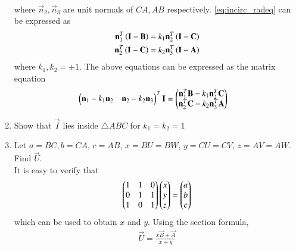 \begin{enumerate}[label=\arabic*.,ref=\thesubsection.\theenumi]
\begin{align}
\label{eq:incirc_radeq}
\end{align}
%
where $\vec{n}_2, \vec{n}_3$ are unit normals of $CA, AB$ respectively.  \eqref{eq:incirc_radeq} can be 
expressed as 
\begin{align}
\mathbf{n}_1^T\left(\mathbf{I}-\mathbf{B}\right) &= k_1\mathbf{n}_2^T\left(\mathbf{I}-\mathbf{C}\right) 
\\
\mathbf{n}_2^T\left(\mathbf{I}-\mathbf{C}\right) &= k_2\mathbf{n}_3^T\left(\mathbf{I}-\mathbf{A}\right)
\label{eq:incirc_k1k2}
\end{align}
%
where $k_1,k_2 = \pm 1$. The above equations can be expressed as the matrix equation
\begin{align}
\begin{pmatrix}\mathbf{n}_1-k_1\mathbf{n}_2 & \mathbf{n}_2 - k_2\mathbf{n}_3\end{pmatrix}^T\mathbf{I} &= 
\begin{pmatrix}\mathbf{n}_1^T\mathbf{B}-k_1\mathbf{n}_2^T\mathbf{C} \\ \mathbf{n}_2^T \mathbf{C} - k_2\mathbf{n}_3^T\mathbf{A}\end{pmatrix}
\label{eq:incirc_k1k2fin}
\end{align}
\item Show that $\vec{I}$ lies inside $\triangle ABC$ for $k_1=k_2=1$
\item Let $a = BC, b = CA$, $ c= AB$, $x = BU=BW$, $y = CU=CV$, $z = AV=AW$. Find $\vec{U}$.
\\
\solution It is easy to verify that 
\begin{align}
\label{eq:incircle_mat}
\begin{pmatrix}1 & 1 & 0\\0 & 1 & 1\\1 & 0 & 1\end{pmatrix}\begin{pmatrix}x\\y\\z\end{pmatrix} = \begin{pmatrix}a\\b\\c\end{pmatrix}
\end{align}
%
which can be used to obtain $x$ and $y$.
Using the section formula, 
\begin{align}
\vec{U} = \frac{x\vec{B}+\vec{A}}{x+y}
\end{align}


\end{enumerate}
